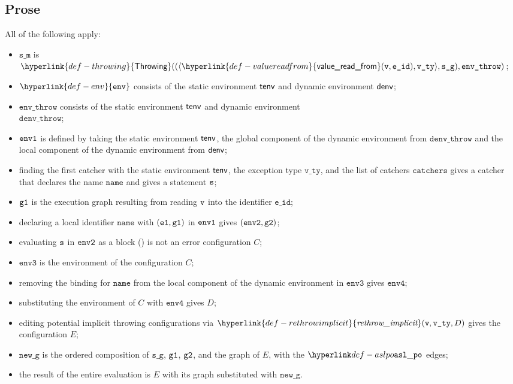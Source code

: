 \documentclass{book}
\newcommand\ErrorConfig[0]{\hyperlink{def-errorconfig}{\texttt{\#DE}}}
\newcommand\ProseOrError[0]{\ProseTerminateAs{\ErrorConfig}}
\newcommand\rethrowimplicit[0]{\hyperlink{def-rethrowimplicit}{\textfunc{rethrow\_implicit}}}
\newcommand\valuereadfrom[0]{\hyperlink{def-valuereadfrom}{\textsf{value\_read\_from}}}
\newcommand\Throwing[0]{\hyperlink{def-throwing}{\textsf{Throwing}}}
\newcommand\env[0]{\hyperlink{def-env}{\texttt{env}}}
\newcommand\envthree[0]{\texttt{env3}}
\newcommand\envfour[0]{\texttt{env4}}
\newcommand\newg[0]{\texttt{new\_g}}
\newcommand\veone[0]{\texttt{e1}}
\newcommand\name[0]{\texttt{name}}
\newcommand\catchers[0]{\texttt{catchers}}
\newcommand\envthrow[0]{\texttt{env\_throw}}
\newcommand\denvthrow[0]{\texttt{denv\_throw}}
\newcommand\sm[0]{\texttt{s\_m}}
\newcommand\sg[0]{\texttt{s\_g}}
\newcommand\vvty[0]{\texttt{v\_ty}}
\newcommand\eid[0]{\texttt{e\_id}}
\begin{document}
  \subsection{Prose}
  All of the following apply:
  \begin{itemize}
    \item $\sm$ is $\Throwing((\langle \valuereadfrom(\vv, \eid), \vvty \rangle, \sg), \envthrow)$;
    \item $\env$ consists of the static environment $\textsf{tenv}$ and dynamic environment $\textsf{denv}$;
    \item $\envthrow$ consists of the static environment $\textsf{tenv}$ and dynamic environment \\ $\denvthrow$;
    \item $\texttt{env1}$ is defined by taking the static environment $\textsf{tenv}$, the global component of the dynamic
    environment from $\denvthrow$ and the local component of the dynamic environment from $\textsf{denv}$;
    \item finding the first catcher with the static environment $\textsf{tenv}$, the exception type $\vvty$,
    and the list of catchers $\catchers$ gives a catcher that declares the name $\name$ and gives a statement $\texttt{s}$;
    \item $\texttt{g1}$ is the execution graph resulting from reading $\texttt{v}$ into the identifier $\eid$;
    \item declaring a local identifier $\name$ with $(\veone, \vgone)$ in $\texttt{env1}$ gives $(\texttt{env2}, \texttt{g2})$;
    \item evaluating $\texttt{s}$ in $\texttt{env2}$ as a block () is not an error
    configuration $C$\ProseOrError;
    \item $\envthree$ is the environment of the configuration $C$;
    \item removing the binding for $\name$ from the local component of the dynamic environment in $\envthree$
    gives $\envfour$;
    \item substituting the environment of $C$ with $\envfour$ gives $D$;
    \item editing potential implicit throwing configurations via $\rethrowimplicit(\vv, \vvty, D)$
    gives the configuration $E$;
    \item $\newg$ is the ordered composition of $\sg$, $\texttt{g1}$, $\texttt{g2}$, and the graph of $E$,
    with the $\aslpo$ edges;
    \item the result of the entire evaluation is $E$ with its graph substituted with $\newg$.
  \end{itemize}
\end{document}
